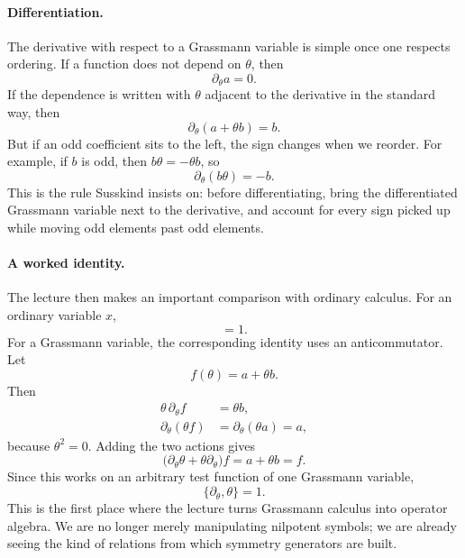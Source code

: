 \paragraph{Differentiation.}
The derivative with respect to a Grassmann variable is simple once one respects ordering. If a function does not depend on \(\theta\), then
\begin{equation}
\partial_\theta a = 0.
\end{equation}
If the dependence is written with \(\theta\) adjacent to the derivative in the standard way, then
\begin{equation}
\partial_\theta(a+\theta b)=b.
\end{equation}
But if an odd coefficient sits to the left, the sign changes when we reorder. For example, if \(b\) is odd, then \(b\theta=-\theta b\), so
\begin{equation}
\partial_\theta(b\theta)=-b.
\end{equation}
This is the rule Susskind insists on: before differentiating, bring the differentiated Grassmann variable next to the derivative, and account for every sign picked up while moving odd elements past odd elements.

\paragraph{A worked identity.}
The lecture then makes an important comparison with ordinary calculus. For an ordinary variable \(x\),
\begin{equation}
[\partial_x,x]=1.
\end{equation}
For a Grassmann variable, the corresponding identity uses an anticommutator. Let
\begin{equation}
f(\theta)=a+\theta b.
\end{equation}
Then
\begin{align}
\theta\,\partial_\theta f &= \theta b, \\
\partial_\theta(\theta f) &= \partial_\theta(\theta a)=a,
\end{align}
because \(\theta^2=0\). Adding the two actions gives
\begin{equation}
\bigl(\partial_\theta\theta+\theta\partial_\theta\bigr)f
=
a+\theta b
=
f.
\end{equation}
Since this works on an arbitrary test function of one Grassmann variable,
\begin{equation}
\{\partial_\theta,\theta\}=1.
\end{equation}
This is the first place where the lecture turns Grassmann calculus into operator algebra. We are no longer merely manipulating nilpotent symbols; we are already seeing the kind of relations from which symmetry generators are built.

